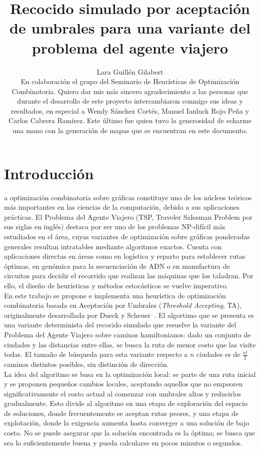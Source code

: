 \documentclass[9pt,a4paper,twocolumn,twoside]{tau-class/tau}
\title{Recocido simulado por aceptaci\'on de umbrales para una variante del problema del agente viajero}
\author[]{Lara Guill\'en Gilabert\\

\small{En colaboraci\'on el grupo del Seminario de Heur\'isticas de Optimizaci\'on Combinatoria. Quiero dar mis m\'as sincero agradecimiento a las personas que durante el desarrollo de este proyecto intercambiaron conmigo sus ideas y resultados, en especial a Wendy S\'anchez Cort\'es, Manuel Ianluck Rojo Peña y Carlos Cabrera Ram\'irez. Este \'ultimo fue quien tuvo la generosidad de echarme una mano con la generaci\'on de mapas que se encuentran en este documento.}}
\begin{document}
		
    \maketitle 
    \thispagestyle{firststyle}
    

\section{Introducci\'on}

    a optimizaci\'on combinatoria sobre gr\'aficas constituye uno de los n\'ucleos te\'oricos m\'as importantes en las ciencias de la computaci\'on, debido a sus aplicaciones pr\'acticas. El Problema del Agente Viajero (TSP, Traveler Salesman Problem por sus siglas en ingl\'es) destaca por ser uno de los problemas NP-dif\'icil m\'as estudiados en el \'area, cuyas variantes de optimizaci\'on sobre gr\'aficas ponderadas generales resultan intratables mediante algoritmos exactos. Cuenta con aplicaciones directas en \'areas como en log\'istica y reparto para establecer rutas \'optimas, en gen\'omica para la secuenciaci\'on de ADN o en manufactura de circuitos para decidir el recorrido que realizan las m\'aquinas que los taladran. Por ello, el diseño de heur\'isticas y m\'etodos estoc\'asticos se vuelve imperativo.\\
    

    En este trabajo se propone e implementa una heur\'istica de optimizaci\'on combinatoria basada en Aceptaci\'on por Umbrales (\textit{Threshold Accepting}, TA), originalmente desarrollada por Dueck y Scheuer~\cite{dueck1990threshold}. El algortimo que se presenta es una variante determinista del recocido simulado que resuelve la variante del Problema del Agente Viajero sobre caminos hamiltonianos: dado un conjunto de ciudades y las distancias entre ellas, se busca la ruta de menor costo que las visite todas. El tamaño de b\'usqueda para esta variante respecto a $n$ ciudades es de $\frac{n!}{2}$ caminos distintos posibles, sin distinci\'on de direcci\'on.\\
    
    
    La idea del algoritmo se basa en la optimización local: se parte de una ruta inicial y se proponen pequeños cambios locales, aceptando aquellos que no empeoren significativamente el costo actual al comenzar con umbrales altos y reducirlos gradualmente. Esto divide al algoritmo en una etapa de exploración del espacio de soluciones, donde frecuentemente se aceptan rutas peores, y una etapa de explotación, donde la exigencia aumenta hasta converger a una solución de bajo costo. No se puede asegurar que la soluci\'on encontrada es la \'optima; se busca que sea lo suficientemente buena y pueda calcularse en pocos minutos o segundos.\\
\end{document}
